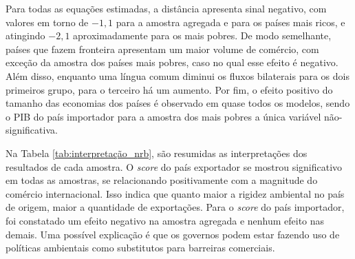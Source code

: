 \documentclass[12pt,
               openright,
               oneside,
               a4paper,
							 section=TITLE,     %
               subsection=Title,  %
               english,brazil]{article}
\begin{document}
Para todas as equações estimadas, a distância apresenta sinal negativo, com valores em torno de $-1,1$ para a amostra agregada e para os países mais ricos, e atingindo $-2,1$ aproximadamente para os mais pobres. De modo semelhante, países que fazem fronteira apresentam um maior volume de comércio, com exceção da amostra dos países mais pobres, caso no qual esse efeito é negativo. Além disso, enquanto uma língua comum diminui os fluxos bilaterais para os dois primeiros grupo, para o terceiro há um aumento. Por fim, o efeito positivo do tamanho das economias dos países é observado em quase todos os modelos, sendo o PIB do país importador para a amostra dos mais pobres a única variável não-significativa.

Na Tabela \ref{tab:interpretação_nrb}, são resumidas as interpretações dos resultados de cada amostra. O \textit{score} do país exportador se mostrou significativo em todas as amostras, se relacionando positivamente com a magnitude do comércio internacional. Isso indica que quanto maior a rigidez ambiental no país de origem, maior a quantidade de exportações. Para o \textit{score} do país importador, foi constatado um efeito negativo na amostra agregada e nenhum efeito nas demais. Uma possível explicação é que os governos podem estar fazendo uso de políticas ambientais como substitutos para barreiras comerciais.
\end{document}
